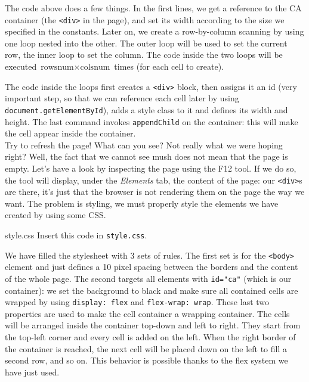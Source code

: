 The code above does a few things. In the first lines, we get a reference to the CA container
(the \texttt{<div>} in the page), and set its width according to the size we specified in the
constants. Later on, we create a row-by-column scanning by using one loop nested into the other.
The outer loop will be used to set the current row, the inner loop to set the column. The code
inside the two loops will be executed $\text{rowsnum} \times \text{colsnum}$ times
(for each cell to create).

The code inside the loops first creates a \texttt{<div>} block, then assigns it an id (very
important step, so that we can reference each cell later
by using \texttt{document.getElementById}), adds a style class to it and defines its width and height.
The last command invokes \texttt{appendChild} on the container: this will make the cell appear
inside the container.\\

Try to refresh the page! What can you see? Not really what we were hoping right? Well, the fact that
we cannot see mush does not mean that the page is empty. Let's have a look by inspecting the page
using the F12 tool. If we do so, the tool will display, under the \textit{Elements} tab, the
content of the page: our \texttt{<div>}s are there, it's just that the browser is not rendering
them on the page the way we want. The problem is styling, we must properly style the elements we
have created by using some CSS.

\begin{programcode}{style.css}
Insert this code in \texttt{style.css}.
\end{programcode}

We have filled the stylesheet with 3 sets of rules. The first set is for the \texttt{<body>} element
and just defines a 10 pixel spacing between the borders and the content of the whole page.
The second targets
all elements with \texttt{id="ca"} (which is our container): we set the background to black and
make sure all contained cells are wrapped by using \texttt{display: flex} and \texttt{flex-wrap: wrap}.
These last two properties are used to make the cell container a wrapping container. The cells will be
arranged inside the container top-down and left to right. They start from the top-left corner and every
cell is added on the left. When the right border of the container is reached, the next cell will be placed
down on the left to fill a second row, and so on. This behavior is possible thanks to the flex system
we have just used.

